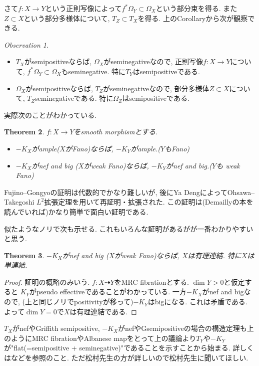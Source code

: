 \documentclass[dvipdfmx,a4paper,11pt]{article} %
\newtheorem{thm}{Theorem}[section]
\theoremstyle{definition}
\theoremstyle{remark}
\newtheorem{obs}[thm]{Observation}
\numberwithin{equation}{section}
\begin{document}
さて$f : X \to Y$という正則写像によって$f^{*}\Omega_{Y} \subset \Omega_{X}$という部分束を得る. 
また$Z \subset X$という部分多様体について, $T_{Z} \subset T_X$を得る.
上のCorollaryから次が観察できる.
\begin{tcolorbox}[mybox]
\begin{obs}
\text{}
\begin{itemize}
\item $T_X$がsemipositiveならば, $\Omega_{X}$がseminegativeなので, 正則写像$f : X \to Y$について, $f^{*}\Omega_{Y} \subset \Omega_{X}$もseminegative. 
特に$T_Y$はsemipositiveである.
\item $\Omega_X$がsemipositiveならば, $T_{Z}$がseminegativeなので, 部分多様体$Z \subset X$について, $T_{Z}$seminegativeである. 特に$\Omega_{Z}$はsemipositiveである.
\end{itemize}
\end{obs}
\end{tcolorbox}

実際次のことがわかっている. 
\begin{thm}\cite{FG12}
$f : X \to Y$をsmooth morphismとする.
\begin{itemize}
\item $-K_X$がample($X$がFano)ならば, $-K_Y$がample.($Y$もFano)
\item $-K_X$がnef and big ($X$がweak Fano)ならば, $-K_Y$がnef and big.($Y$も weak Fano)
\end{itemize}
\end{thm}
Fujino--Gongyoの証明は代数的でかなり難しいが, 後にYa Deng\cite{Deng21}によってOhsawa--Takegoshi $L^2$拡張定理を用いて再証明・拡張された. 
この証明は(Demaillyの本を読んでいれば)かなり簡単で面白い証明である. 

似たようなノリで次も示せる. これもいろんな証明があるが\cite{Deng21}が一番わかりやすいと思う.
\begin{thm}
$-K_X$がnef and big ($X$がweak Fano)ならば, $X$は有理連結. 特に$X$は単連結.
\end{thm}
\begin{proof}
証明の概略のみいう.
$f : X \dashrightarrow Y$をMRC fibrationとする. $\dim Y>0$と仮定すると
$K_Y$がpseudo effectiveであることがわかっている. 
一方$-K_X$がnef and bigなので, (上と同じノリでpositivityが移って)$-K_Y$はbigになる. これは矛盾である. 
よって$\dim Y=0$で$X$は有理連結である. 
\end{proof}

$T_X$がnefやGriffith semipositive, $-K_X$がnefやGsemipositiveの場合の構造定理も上のようにMRC fibrationやAlbanese mapをとって上の議論より$T_Y$や$-K_Y$が"flat(=semipositive + seminegative)"であることを示すことから始まる. 
詳しくは\cite{CP91, DPS94, CH19, MW21, MWWZ25}などを参照のこと. ただ松村先生の方が詳しいので松村先生に聞いてほしい. 
\end{document}
